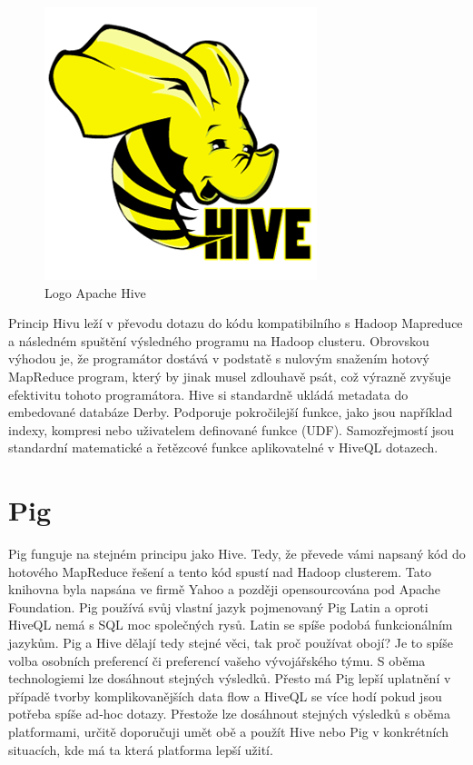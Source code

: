 \begin{figure}
  \centering
    \includegraphics[scale=0.5]{images/hive_logo}
\caption{Logo Apache Hive}

\end{figure}

Princip Hivu leží v převodu dotazu do kódu kompatibilního s Hadoop Mapreduce a následném spuštění výsledného programu na Hadoop clusteru. Obrovskou výhodou je, že programátor dostává v podstatě s nulovým snažením hotový MapReduce program, který by jinak musel zdlouhavě psát, což výrazně zvyšuje efektivitu tohoto programátora. Hive si standardně ukládá metadata do embedované databáze Derby. Podporuje pokročilejší funkce, jako jsou například indexy, kompresi nebo uživatelem definované funkce (UDF). Samozřejmostí jsou standardní matematické a řetězcové funkce aplikovatelné v HiveQL dotazech. 



\section{Pig}


Pig funguje na stejném principu jako Hive. Tedy, že převede vámi napsaný kód do hotového MapReduce řešení a tento kód spustí nad Hadoop clusterem. Tato knihovna byla napsána ve firmě Yahoo a později opensourcována pod Apache Foundation. Pig používá svůj vlastní jazyk pojmenovaný Pig Latin a oproti HiveQL nemá s SQL moc společných rysů. Latin se spíše podobá funkcionálním jazykům. Pig a Hive dělají tedy stejné věci, tak proč používat obojí? Je to spíše volba osobních preferencí či preferencí vašeho vývojářského týmu. S oběma technologiemi lze dosáhnout stejných výsledků. Přesto má Pig lepší uplatnění v případě tvorby komplikovanějších data flow a HiveQL se více hodí pokud jsou potřeba spíše ad-hoc dotazy. Přestože lze dosáhnout stejných výsledků s oběma platformami, určitě doporučuji umět obě a použít Hive nebo Pig v konkrétních situacích, kde má ta která platforma lepší užití. 



